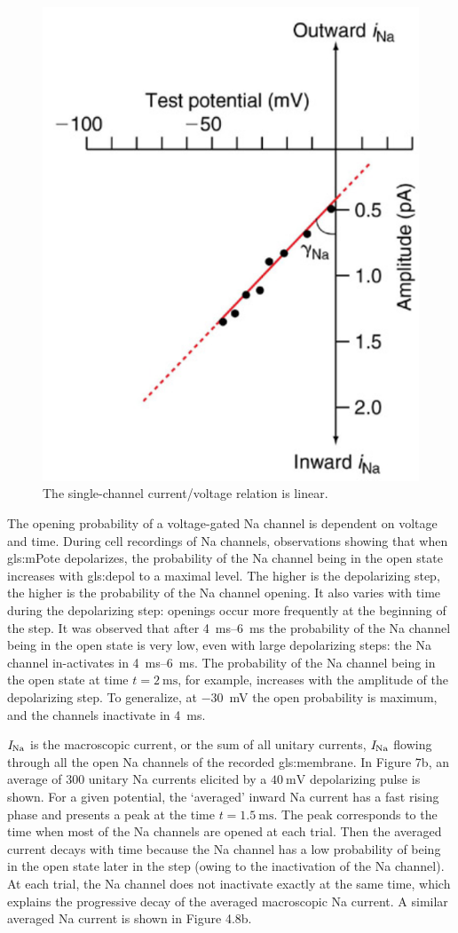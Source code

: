 \documentclass[class={myRUCProject}, crop=false]{standalone}
\begin{document}
\begin{figure}[H]
  \centering
  \includegraphics[width=0.5\linewidth]{Pictures//Anakin/iNa-VNa.png}
  \caption{The single-channel current/voltage \br{\unit[per-mode = symbol]{\curr\sodium\per\volt}} relation is linear. }
  \label{fig:NaVNa}
\end{figure}
The opening probability of a voltage-gated \gls{Na} channel is dependent on voltage and time. During cell recordings of \gls{Na} channels, observations showing that when \gls{gls:mPote} depolarizes, the probability of the \gls{Na} channel being in the open state increases with \gls{gls:depol} to a maximal level. The higher is the depolarizing step, the higher is the probability of the \gls{Na} channel opening. It also varies with time during the depolarizing step: openings occur more frequently at the beginning of the step. It was observed that after \qtyrange{4}{6}{\ms} the probability of the \gls{Na} channel being in the open state is very low, even with large depolarizing steps: the \gls{Na} channel in-activates in \qtyrange{4}{6}{\ms}. The probability of the \gls{Na} channel being in the open state at time \(t=\qty{2}{\ms}\), for example, increases with the amplitude of the depolarizing step. To generalize, at \qty{-30}{\mV} the open probability is maximum, and the channels inactivate in \qty{4}{\ms}. 

\(\mathit{I}_\mathrm{Na}\) is the macroscopic current, or the sum of all unitary currents, \(\mathit{I}_\mathrm{Na}\) flowing through all the open \gls{Na} channels of the recorded \gls{gls:membrane}. In Figure 7b, an average of \(\num{300}\) unitary \gls{Na} currents elicited by a \(\qty{40}{\mV}\) depolarizing pulse is shown. For a given potential, the `averaged' inward \gls{Na} current has a fast rising phase and presents a peak at the time \(t=\qty{1.5}{\ms}\). The peak corresponds to the time when most of the \gls{Na} channels are opened at each trial. Then the averaged current decays with time because the \gls{Na} channel has a low probability of being in the open state later in the step (owing to the inactivation of the \gls{Na} channel). At each trial, the \gls{Na} channel does not inactivate exactly at the same time, which explains the progressive decay of the averaged macroscopic \gls{Na} current. A similar averaged \gls{Na} current is shown in Figure 4.8b. %
\end{document}
